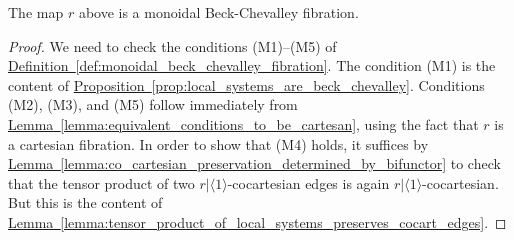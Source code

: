 \documentclass[main.tex]{subfiles}
\begin{document}
\begin{proposition}
  The map $r$ above is a monoidal Beck-Chevalley fibration.
\end{proposition}
\begin{proof}
  We need to check the conditions (M1)--(M5) of \hyperref[def:monoidal_beck_chevalley_fibration]{Definition~\ref*{def:monoidal_beck_chevalley_fibration}}. The condition (M1) is the content of \hyperref[prop:local_systems_are_beck_chevalley]{Proposition~\ref*{prop:local_systems_are_beck_chevalley}}. Conditions (M2), (M3), and (M5) follow immediately from \hyperref[lemma:equivalent_conditions_to_be_cartesan]{Lemma~\ref*{lemma:equivalent_conditions_to_be_cartesan}}, using the fact that $r$ is a cartesian fibration. In order to show that (M4) holds, it suffices by \hyperref[lemma:co_cartesian_preservation_determined_by_bifunctor]{Lemma~\ref*{lemma:co_cartesian_preservation_determined_by_bifunctor}} to check that the tensor product of two $r|\langle 1 \rangle$-cocartesian edges is again $r|\langle 1 \rangle$-cocartesian. But this is the content of \hyperref[lemma:tensor_product_of_local_systems_preserves_cocart_edges]{Lemma~\ref*{lemma:tensor_product_of_local_systems_preserves_cocart_edges}}.
\end{proof}
\end{document}

